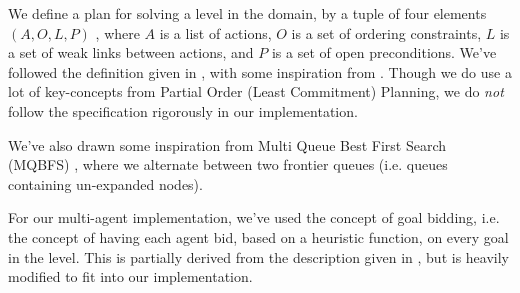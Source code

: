 \documentclass[Main]{subfiles}
\begin{document}

We define a plan for solving a level in the domain, by a tuple of four elements $(A,O,L,P)$ \citep{Weld1994}\citep{Russell2003}, where $A$ is a list of actions, $O$ is a set of ordering constraints, $L$ is a set of weak links between actions, and $P$ is a set of open preconditions. 
We've followed the definition given in \cite{Russell2003}, with some inspiration from \cite{Weld1994}.
Though we do use a lot of key-concepts from Partial Order (Least Commitment) Planning, we do \textit{not} follow the specification rigorously in our implementation.

We've also drawn some inspiration from Multi Queue Best First Search (MQBFS) \citep[p.~38]{hector2013a}, where we alternate between two frontier queues (i.e. queues containing un-expanded nodes).

For our multi-agent implementation, we've used the concept of goal bidding, i.e. the concept of having each agent bid, based on a heuristic function, on every goal in the level.
This is partially derived from the description given in \cite{VanderKrogt2005}, but is heavily modified to fit into our implementation.

\end{document}
